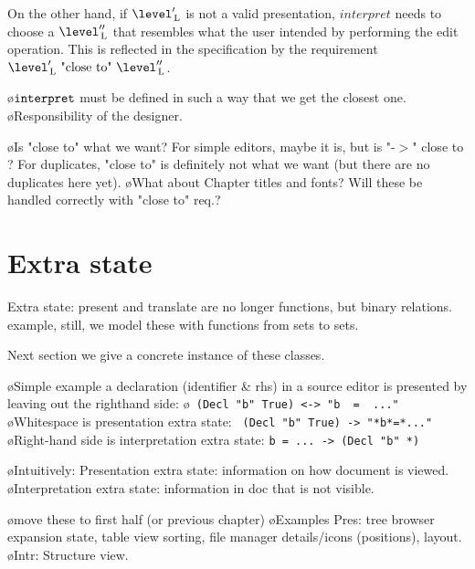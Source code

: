 
On the other hand, if $\level'\L$ is not a valid presentation, $interpret$ needs to choose a  $\level''\L$ that resembles what the user intended by performing the edit operation. This is reflected in the specification by the requirement $\level'\L~\text{"close to"}~\level''\L$.

\bl
\o ${\tt interpret}$ must be defined in such a way that we get the closest one.
\o Responsibility of the designer.
\el

\bl
\o Is "close to" what we want? For simple editors, maybe it is, but is "-$>$" close to \rarr? For duplicates, "close to" is definitely not what we want (but there are no duplicates here yet).
\o What about Chapter titles and fonts? Will these be handled correctly with "close to" req.?
\el










%																
%																
%																
\section{Extra state} \label{sect:singleExtra}


Extra state: present and translate are no longer functions, but binary relations. example, still, we model these with functions from sets to sets.

Next section we give a concrete instance of these classes.

\bl
\o Simple example a declaration (identifier \& rhs) in a source editor is presented by leaving out the righthand side:
\o  \verb| (Decl "b" True) <-> "b  =  ..."|
\o Whitespace is presentation extra state: \verb| (Decl "b" True) -> "*b*=*..."|
\o Right-hand side is interpretation extra state: \verb|b = ... -> (Decl "b" *)|
\el

\bl
\o Intuitively: Presentation extra state: information on how document is viewed. 
\o Interpretation extra state: information in doc that is not visible. 
\el

\bl
\o move these to first half (or previous chapter)
\o Examples Pres: tree browser expansion state, table view sorting, file manager details/icons (positions), layout.
\o Intr: Structure view.
\el

